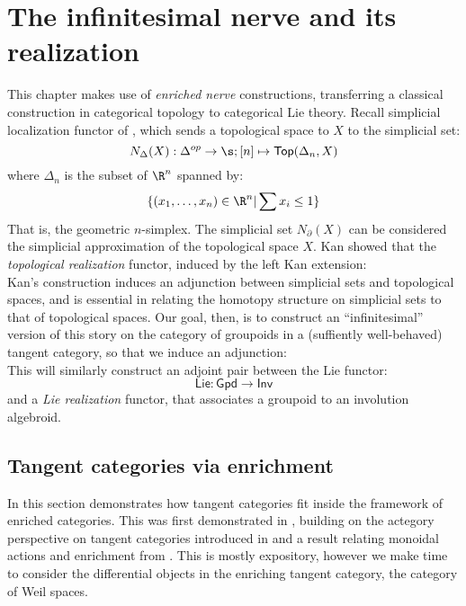 
% 

\chapter{The infinitesimal nerve and its realization}%
\label{ch:inf-nerve-and-realization}

This chapter makes use of \emph{enriched nerve} constructions, transferring a classical construction in categorical topology to categorical Lie theory. Recall simplicial localization functor of \cite{Kan1958}, which sends a topological space to $X$ to the simplicial set:
\[
    N_\Delta(X): \Delta^{op} \to \s; [n] \mapsto \mathsf{Top}(\Delta_n, X)
\]
where $\Delta_n$ is the subset of $\R^n$ spanned by:
\[
    \{
        (x_1, \dots, x_n) \in \R^n | \sum x_i \le 1
    \}    
\]
That is, the geometric $n$-simplex. The simplicial set $N_\partial(X)$ can be considered the simplicial approximation of the topological space $X$.
Kan showed that the \emph{topological realization} functor, induced by the left Kan extension:
\[\]
Kan's construction induces an adjunction between simplicial sets and topological spaces, and is essential in relating the homotopy structure on simplicial sets to that of topological spaces.
Our goal, then, is to construct an ``infinitesimal'' version of this story on the category of groupoids in a (suffiently well-behaved) tangent category, so that we induce an adjunction:
\[\]
This will similarly construct an adjoint pair between the Lie functor:
\[
    \mathsf{Lie}: \mathsf{Gpd} \to \mathsf{Inv}  
\]
and a \emph{Lie realization} functor, that associates a groupoid to an involution algebroid.


\section{Tangent categories via enrichment}%
\label{sec:tang-cats-enrichment}

In this section demonstrates how tangent categories fit inside the framework of enriched categories.  This was first demonstrated in \cite{Garner2018}, building on the actegory perspective on tangent categories introduced in \cite{Leung2017} and a result relating monoidal actions and enrichment from \cite{Wood1978}. This is mostly expository, however we make time to consider the differential objects in the enriching tangent category, the category of Weil spaces.


